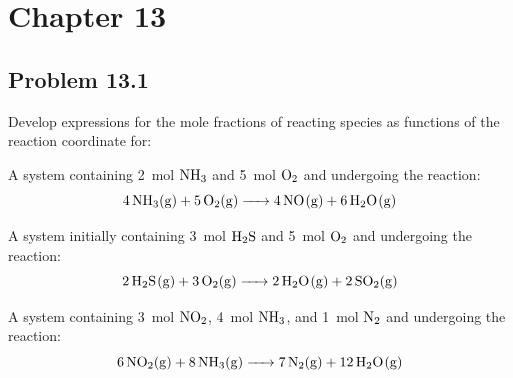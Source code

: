 \section*{Chapter 13}

\subsection*{Problem 13.1}
Develop expressions for the mole fractions of reacting species as
functions of the reaction coordinate for:

\begin{abcls}
\item A system containing 2~\unit{\mole} \(\ce{NH3}\) and
  5~\unit{\mole} \(\ce{O2}\) and undergoing the reaction:
  \begin{equation*}
    \ce{4NH3(g) + 5O2(g) -> 4NO(g) + 6H2O(g)}
  \end{equation*}
\item A system initially containing 3~\unit{\mole} \(\ce{H2S}\) and
  5~\unit{\mole} \(\ce{O2}\) and undergoing the reaction:
  \begin{equation*}
    \ce{2H2S(g) + 3O2(g) -> 2H2O(g) + 2SO2(g)}
  \end{equation*}
\item A system containing 3~\unit{\mole} \(\ce{NO2}\),
  4~\unit{\mole} \(\ce{NH3}\), and 1~\unit{\mole} \(\ce{N2}\) and
  undergoing the reaction:
  \begin{equation*}
    \ce{6NO2(g) + 8NH3(g) -> 7N2(g) + 12H2O(g)}
  \end{equation*}
\end{abcls}

